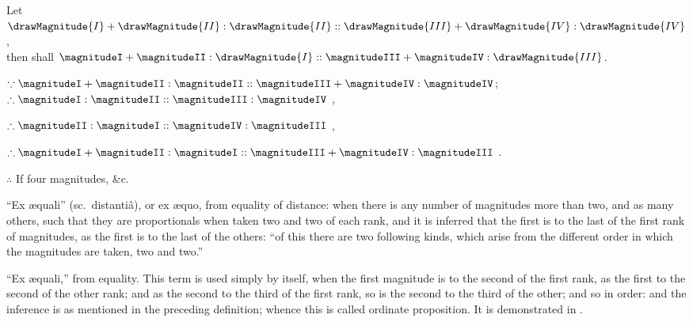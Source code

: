 \documentclass[booklanguage=english]{byrnebook}
\begin{document}
\begin{center}
Let $ \drawMagnitude{I} + \drawMagnitude{II} : \drawMagnitude{II} ::  \drawMagnitude{III} + \drawMagnitude{IV} : \drawMagnitude{IV}$,\\
then shall $\magnitudeI + \magnitudeII : \drawMagnitude{I} :: \magnitudeIII + \magnitudeIV : \drawMagnitude{III}$.

$\because \magnitudeI + \magnitudeII : \magnitudeII :: \magnitudeIII + \magnitudeIV : \magnitudeIV$;\\ %
$\therefore \magnitudeI : \magnitudeII :: \magnitudeIII : \magnitudeIV$ , %

$\therefore \magnitudeII : \magnitudeI :: \magnitudeIV : \magnitudeIII$ ,

$\therefore \magnitudeI + \magnitudeII : \magnitudeI :: \magnitudeIII + \magnitudeIV : \magnitudeIII$ .

$\therefore$ If four magnitudes, \&c.
\end{center}

\enquote{Ex æquali} (sc.\ distantiâ), or ex æquo, from equality of distance: when there is any number of magnitudes more than two, and as many others, such that they are proportionals when taken two and two of each rank, and it is inferred that the first is to the last of the first rank of magnitudes, as the first is to the last of the others: \enquote{of this there are two following kinds, which arise from the different order in which the magnitudes are taken, two and two.}

\vfill\pagebreak

\def\varA{\textcolor{byred}{A}}
\def\varB{\textcolor{byred}{B}}
\def\varC{\textcolor{byyellow}{C}}
\def\varD{\textcolor{byyellow}{D}}
\def\varE{\textcolor{byblue}{E}}
\def\varF{\textcolor{byblue}{F}}
\def\varL{\textcolor{byred}{L}}
\def\varM{\textcolor{byred}{M}}
\def\varN{\textcolor{byyellow}{N}}
\def\varO{\textcolor{byyellow}{O}}
\def\varP{\textcolor{byblue}{P}}
\def\varQ{\textcolor{byblue}{Q}}
\enquote{Ex æquali,} from equality. This term is used simply by itself, when the first magnitude is to the second of the first rank, as the first to the second of the other rank; and as the second to the third of the first rank, so is the second to the third of the other; and so in order: and the inference is as mentioned in the preceding definition; whence this is called ordinate proposition. It is demonstrated in .
\end{document}
